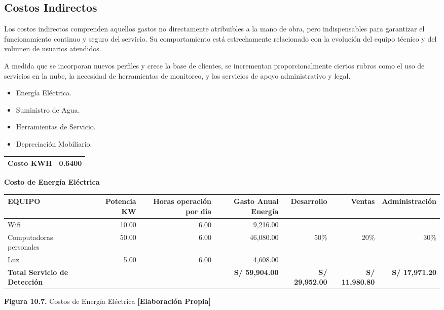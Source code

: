 \subsection{Costos Indirectos}

Los costos indirectos comprenden aquellos gastos no directamente atribuibles a la mano de obra, pero indispensables para garantizar el funcionamiento continuo y seguro del servicio. Su comportamiento está estrechamente relacionado con la evolución del equipo técnico y del volumen de usuarios atendidos.

A medida que se incorporan nuevos perfiles y crece la base de clientes, se incrementan proporcionalmente ciertos rubros como el uso de servicios en la nube, la necesidad de herramientas de monitoreo, y los servicios de apoyo administrativo y legal.

\begin{itemize}
    \item Energía Eléctrica.
    
    \item Suministro de Agua.
    
    \item Herramientas de Servicio.
    
    \item Depreciación Mobiliario.
\end{itemize}

\begin{table}[H]
\centering
\scriptsize
\renewcommand{\arraystretch}{1.15}
\setlength{\tabcolsep}{5pt}
\begin{tabular}{|l|r|}
\hline
\textbf{Costo KWH} & \textbf{0.6400} \\ \hline
\end{tabular}

\vspace{0.15cm}

\textbf{Costo de Energía Eléctrica}

\vspace{0.15cm}

\begin{tabular}{|l|r|r|r|r|r|r|}
\hline
\textbf{EQUIPO} & \textbf{Potencia KW} & \textbf{Horas operación por día} & \textbf{Gasto Anual Energía} & \textbf{Desarrollo} & \textbf{Ventas} & \textbf{Administración} \\ \hline
Wifi & 10.00 & 6.00 & 9,216.00 &  &  &  \\ \hline
Computadoras personales & 50.00 & 6.00 & 46,080.00 & 50\% & 20\% & 30\% \\ \hline
Luz & 5.00 & 6.00 & 4,608.00 &  &  &  \\ \hline
\textbf{Total Servicio de Detección} &  &  & \textbf{S/ 59,904.00} & \textbf{S/ 29,952.00} & \textbf{S/ 11,980.80} & \textbf{S/ 17,971.20} \\ \hline
\end{tabular}

\vspace{0.2cm}
\textbf{Figura 10.7.} Costos de Energía Eléctrica \textbf{[Elaboración Propia]}
\end{table}
